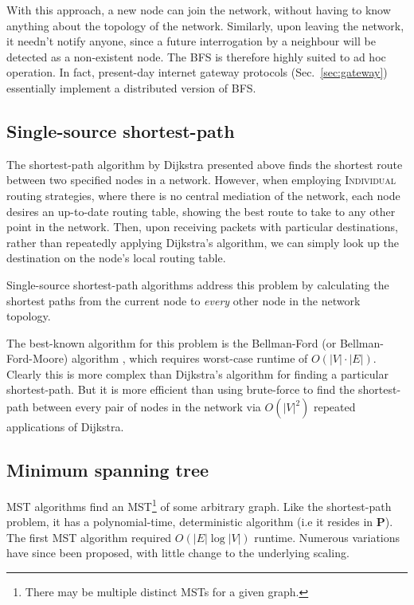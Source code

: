 With this approach, a new node can join the network, without having to know anything about the topology of the network. Similarly, upon leaving the network, it needn't notify anyone, since a future interrogation by a neighbour will be detected as a non-existent node. The BFS is therefore highly suited to ad hoc operation. In fact, present-day internet gateway protocols (Sec.~\ref{sec:gateway}) essentially implement a distributed version of BFS.

%
%

\subsection{Single-source shortest-path} \label{sec:single_source_sp} 

The shortest-path algorithm by Dijkstra presented above finds the shortest route between two specified nodes in a network. However, when employing \textsc{Individual} routing strategies, where there is no central mediation of the network, each node desires an up-to-date routing table, showing the best route to take to any other point in the network. Then, upon receiving packets with particular destinations, rather than repeatedly applying Dijkstra's algorithm, we can simply look up the destination on the node's local routing table.

Single-source shortest-path algorithms address this problem by calculating the shortest paths from the current node to \textit{every} other node in the network topology.

The best-known algorithm for this problem is the Bellman-Ford (or Bellman-Ford-Moore) algorithm \cite{BF}, which requires worst-case runtime of $O(|V|\cdot |E|)$. Clearly this is more complex than Dijkstra's algorithm for finding a particular shortest-path. But it is more efficient than using brute-force to find the shortest-path between every pair of nodes in the network via $O(|V|^2)$ repeated applications of Dijkstra.

%
%

\subsection{Minimum spanning tree} \label{sec:min_tree} 

MST algorithms find an MST\footnote{There may be multiple distinct MSTs for a given graph.} of some arbitrary graph. Like the shortest-path problem, it has a polynomial-time, deterministic algorithm (i.e it resides in \textbf{P}). The first MST algorithm \cite{bib:Boruvka26} required $O(|E|\log |V|)$ runtime. Numerous variations have since been proposed, with little change to the underlying scaling.

